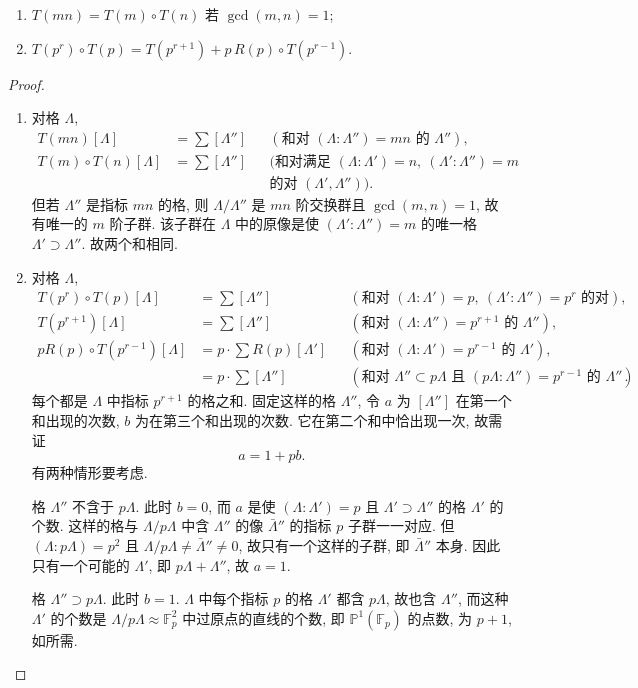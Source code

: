 \begin{proposition} \label{thm:5.4.11}
\begin{enumerate}[label=\textup{(\alph*)}]
\item $T(mn) = T(m)\circ T(n)$ 若 $\gcd(m, n) = 1$;
\item $T(p^r)\circ T(p) = T(p^{r+1}) + p\,R(p)\circ T(p^{r-1})$.
\end{enumerate}
\end{proposition}

\begin{proof}
\begin{enumerate}[label=\textup{(\alph*)}]
\item 对格 $\Lambda$,
\begin{align*}
T(mn)[\Lambda] &= \sum[\Lambda''] && (\text{和对 } (\Lambda:\Lambda'') = mn \text{ 的 } \Lambda''),\\
T(m)\circ T(n)[\Lambda] &= \sum[\Lambda''] && (\text{和对满足 } (\Lambda:\Lambda') = n,\ (\Lambda':\Lambda'') = m\\
&&& \text{的对 } (\Lambda', \Lambda'')).
\end{align*}
但若 $\Lambda''$ 是指标 $mn$ 的格, 则 $\Lambda/\Lambda''$ 是 $mn$ 阶交换群且 $\gcd(m, n) = 1$, 故有唯一的 $m$ 阶子群. 该子群在 $\Lambda$ 中的原像是使 $(\Lambda':\Lambda'') = m$ 的唯一格 $\Lambda'\supset\Lambda''$. 故两个和相同.

\item 对格 $\Lambda$,
\begin{align*}
T(p^r)\circ T(p)[\Lambda] &= \sum[\Lambda''] && (\text{和对 } (\Lambda:\Lambda') = p,\ (\Lambda':\Lambda'') = p^r \text{ 的对}),\\
T(p^{r+1})[\Lambda] &= \sum[\Lambda''] && (\text{和对 } (\Lambda:\Lambda'') = p^{r+1} \text{ 的 } \Lambda''),\\
pR(p)\circ T(p^{r-1})[\Lambda] &= p\cdot\sum R(p)[\Lambda'] && (\text{和对 } (\Lambda:\Lambda') = p^{r-1} \text{ 的 } \Lambda'),\\
&= p\cdot\sum[\Lambda''] && (\text{和对 } \Lambda''\subset p\Lambda \text{ 且 } (p\Lambda:\Lambda'') = p^{r-1} \text{ 的 } \Lambda'').
\end{align*}
每个都是 $\Lambda$ 中指标 $p^{r+1}$ 的格之和. 固定这样的格 $\Lambda''$, 令 $a$ 为 $[\Lambda'']$ 在第一个和出现的次数, $b$ 为在第三个和出现的次数. 它在第二个和中恰出现一次, 故需证
\[
a = 1 + pb.
\]
有两种情形要考虑.

格 $\Lambda''$ 不含于 $p\Lambda$. 此时 $b = 0$, 而 $a$ 是使 $(\Lambda:\Lambda') = p$ 且 $\Lambda'\supset\Lambda''$ 的格 $\Lambda'$ 的个数. 这样的格与 $\Lambda/p\Lambda$ 中含 $\Lambda''$ 的像 $\bar{\Lambda}''$ 的指标 $p$ 子群一一对应. 但 $(\Lambda:p\Lambda) = p^2$ 且 $\Lambda/p\Lambda\neq\bar{\Lambda}''\neq 0$, 故只有一个这样的子群, 即 $\bar{\Lambda}''$ 本身. 因此只有一个可能的 $\Lambda'$, 即 $p\Lambda + \Lambda''$, 故 $a = 1$.

格 $\Lambda''\supset p\Lambda$. 此时 $b = 1$. $\Lambda$ 中每个指标 $p$ 的格 $\Lambda'$ 都含 $p\Lambda$, 故也含 $\Lambda''$, 而这种 $\Lambda'$ 的个数是 $\Lambda/p\Lambda\approx\mathbb{F}_p^2$ 中过原点的直线的个数, 即 $\mathbb{P}^1(\mathbb{F}_p)$ 的点数, 为 $p+1$, 如所需.
\end{enumerate}
\end{proof}

